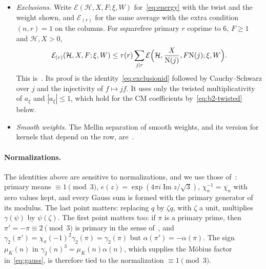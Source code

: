 \documentclass[11pt]{article}
\numberwithin{equation}{section}
\newcommand{\OO}{\mathbb Z[\omega]}
\newcommand{\N}{\mathrm N}
\newcommand{\muk}{\mu_K}
\newcommand{\E}{\mathcal E}
\begin{document}
\begin{itemize}
 $\mathcal R(c,c)=\chi_c(-1)$ there. Reduction
 from $\mathfrak G$ to $(\OO/4\OO)^\times$ is a homomorphism, so $G$ and $\mathcal R$ are
 functions on $\mathfrak G$, and so is $\chi_x(-1)=(-1)^{(\N(x)-1)/6}$. On $\mathfrak G$,
 \begin{equation}\label{eq:b2-quotient}
  \chi_x(-1)\overline{G(x)}G(y)\mathcal R(x,y)=G(yx^{-1})\qquad(x,y\in\mathfrak G),
 \end{equation}
 which is~\cite[(4.7)]{OAI1112}. In~\cite{OAI1112} the group is an unspecified fixed ray
 class group; classes modulo $4$ would suffice for this section, and the modulus $72$
 leaves room for the residue-class factors absorbed into $\xi$ later.
\item \emph{Exclusions.} Write $\E(\mathcal H,X,F;\xi,W)$ for~\eqref{eq:energy} with the
 twist and the weight shown, and $\E_{(r)}$ for the same average with the extra condition
 $(n,r)=1$ on the columns. For squarefree primary $r$ coprime to $6$, $F\ge1$ and $\mathcal H,X>0$,
 \begin{equation}\label{eq:b2-remove}
  \E_{(r)}(\mathcal H,X,F;\xi,W)\le\tau(r)\sum_{j\mid r}
  \E\Bigl(\mathcal H,\frac X{\N(j)},F\N(j);\xi,W\Bigr).
 \end{equation}
 This is~\cite[Lemma~4.4]{OAI1112}. Its proof is the identity~\eqref{eq:exclusionid}
 followed by Cauchy--Schwarz over $j$ and the injectivity of $f\mapsto jf$. It uses only
 the twisted multiplicativity of $a_\xi$ and $|a_\xi|\le1$, which hold for the CM
 coefficients by~\eqref{eq:b2-twisted} below.
\item \emph{Smooth weights.} The Mellin separation of smooth weights, and its version for
 kernels that depend on the row, are~\cite[Lemmas~B.1 and~B.2]{OAI1112}.
\end{itemize}

\paragraph{Normalizations.} The identities above are sensitive to normalizations, and we use
those of~\cite{OAI1112}: primary means $\equiv1\pmod3$, $e(z)=\exp(4\pi i\operatorname{Im}z/\sqrt3)$,
$\chi_n^{-1}=\overline{\chi_n}$ with zero values kept, and every Gauss sum is formed with the
primary generator of its modulus. The last point matters: replacing $q$ by $\zeta q$, with
$\zeta$ a unit, multiplies $\gamma(\psi)$ by $\psi(\zeta)$. The first point matters too: if $\pi$ is a
primary prime, then $\pi'=-\pi\equiv2\pmod3$ is primary in the sense of~\cite{IR}, and
$\gamma_2(\pi')=\chi_\pi(-1)^2\gamma_2(\pi)=\gamma_2(\pi)$ but $\alpha(\pi')=-\alpha(\pi)$.
The sign $\muk(n)$ in $\gamma_2(n)^3=\muk(n)\alpha(n)$, which supplies the M\"obius factor
in~\eqref{eq:gauss}, is therefore tied to the normalization $\equiv1\pmod3$.
\end{document}
